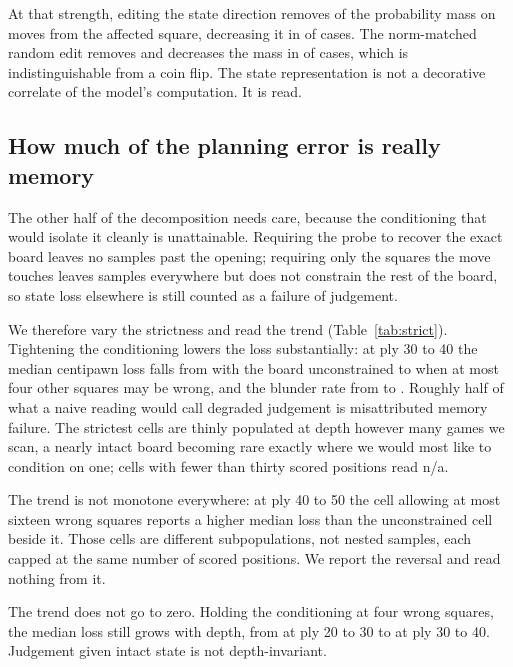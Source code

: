 \documentclass[11pt]{article}
\theoremstyle{remark}
\begin{document}
At that strength, editing the state direction removes  of
the probability mass on moves from the affected square, decreasing it in
 of  cases. The norm-matched random edit
removes  and decreases the mass in
 of cases, which is indistinguishable from a coin flip.
The state representation is not a decorative correlate of the model's
computation. It is read.

\subsection{How much of the planning error is really memory}
\label{sec:plan}

The other half of the decomposition needs care, because the conditioning that
would isolate it cleanly is unattainable. Requiring the probe to recover the
exact board leaves no samples past the opening; requiring only the squares the
move touches leaves samples everywhere but does not constrain the rest of the
board, so state loss elsewhere is still counted as a failure of judgement.

We therefore vary the strictness and read the trend (Table~\ref{tab:strict}).
Tightening the conditioning lowers the loss substantially: at ply 30 to 40 the
median centipawn loss falls from  with the board
unconstrained to  when at most four other squares may be
wrong, and the blunder rate from  to
. Roughly half of what a naive reading would call
degraded judgement is misattributed memory failure. The strictest cells are thinly
populated at depth however many games we scan, a nearly intact board becoming
rare exactly where we would most like to condition on one; cells with fewer than
thirty scored positions read n/a.



The trend is not monotone everywhere: at ply 40 to 50 the cell allowing at most
sixteen wrong squares reports a higher median loss than the unconstrained cell
beside it. Those cells are different subpopulations, not nested samples, each
capped at the same number of scored positions. We report the reversal and read
nothing from it.

The trend does not go to zero. Holding the conditioning at four wrong squares,
the median loss still grows with depth, from  at ply 20
to 30 to  at ply 30 to 40. Judgement given intact state
is not depth-invariant.
\end{document}
